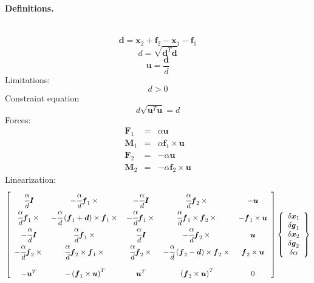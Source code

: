 \documentclass[10pt,dvips,fleqn]{report}
\newcommand{\T}[1]{\boldsymbol{#1}}
\begin{document}
\paragraph{Definitions.} \
\begin{equation}
	\T{d} = \T{x}_2 + \T{f}_2 - \T{x}_1 - \T{f}_1
\end{equation}
\begin{equation}
	d = \sqrt{\T{d}^T \T{d}}
\end{equation}
\begin{equation}
	\T{u} = \frac{\T{d}}{d}
\end{equation}
Limitations:
\begin{equation}
	d > 0
\end{equation}
Constraint equation 
\begin{equation}
	d \sqrt{\T{u}^T \T{u}} = d
\end{equation}
Forces:
\begin{eqnarray}
	\T{F}_1 & = & \alpha \T{u} \\
	\T{M}_1 & = & \alpha \T{f}_1 \times \T{u} \\
	\T{F}_2 & = & -\alpha \T{u} \\
	\T{M}_2 & = & -\alpha \T{f}_2 \times \T{u}
\end{eqnarray}
Linearization:
\begin{equation}
	\sqbr{\matr{ccccc}{
		\cfrac{\alpha}{d}\T{I} & -\cfrac{\alpha}{d}\T{f}_1\times{} &
			-\cfrac{\alpha}{d}\T{I} & \cfrac{\alpha}{d}\T{f}_2\times{} & -\T{u} \\
		\cfrac{\alpha}{d}\T{f}_1\times{} & 
			-\cfrac{\alpha}{d}\plbr{\T{f}_1 + \T{d}}\times\T{f}_1\times{} &
			-\cfrac{\alpha}{d}\T{f}_1\times{} & 
			\cfrac{\alpha}{d}\T{f}_1\times\T{f}_2\times{} & 
			-\T{f}_1\times\T{u} \\
		-\cfrac{\alpha}{d}\T{I} & \cfrac{\alpha}{d}\T{f}_1\times{} &
			\cfrac{\alpha}{d}\T{I} & -\cfrac{\alpha}{d}\T{f}_2\times{} & \T{u} \\
		-\cfrac{\alpha}{d}\T{f}_2\times{} &
			\cfrac{\alpha}{d}\T{f}_2\times\T{f}_1\times{} &
			\cfrac{\alpha}{d}\T{f}_2\times{} &
			- \cfrac{\alpha}{d}\plbr{\T{f}_2 - \T{d}}\times{\T{f}_2\times{}} &
			\T{f}_2\times\T{u} \\
		\\
		-\T{u}^T & - \plbr{\T{f}_1\times\T{u}}^T & 
			\T{u}^T & \plbr{\T{f}_2\times\T{u}}^T & 0
	}}\cubr{\cvvect{
		\delta\T{x}_1 \\
		\delta\T{g}_1 \\
		\delta\T{x}_2 \\
		\delta\T{g}_2 \\
		\delta\alpha
	}}
\end{equation}
\end{document}
